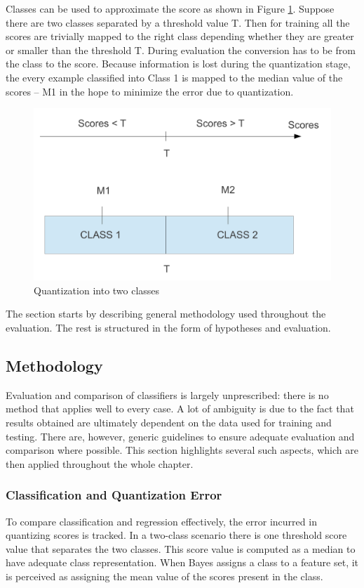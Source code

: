 \documentclass[12pt,notitlepage,twoside]{scrreprt}
\begin{document}
Classes can be used to approximate the score as shown in Figure
\ref{diag:quant}. Suppose there are two classes separated by a threshold value T. Then for
training all the scores are trivially mapped to the right class depending whether they are
greater or smaller than the threshold T. During evaluation the conversion has to be from
the class to the score. Because information is lost during the quantization stage, the
every example classified into Class 1 is mapped to the median value of the scores -- M1
in the hope to minimize the error due to quantization.
\begin{figure}[h!]
	\centering
  \includegraphics[width=0.6\linewidth]{figs/quantiz.pdf}
  \caption{Quantization into two classes\label{diag:quant}}
\end{figure}

The section starts by describing general methodology used throughout the evaluation. The
rest is structured in the form of hypotheses and evaluation. 
\subsection{Methodology}
Evaluation and comparison of classifiers is largely unprescribed: there is no method
that applies well to every case. A lot of ambiguity is due to the fact that results obtained are
ultimately dependent on the data used for training and testing. There are, however,
generic guidelines to ensure adequate evaluation and comparison where possible. 
This section highlights several such aspects, which are then applied throughout the whole
chapter.

\subsubsection*{Classification and Quantization Error}
To compare classification and regression effectively, the error incurred in quantizing
scores is tracked. In a two-class scenario there is one threshold score value that
separates the two classes. This score value is computed as a median to have adequate class
representation. When Bayes assigns a class to a feature set, it is perceived as assigning
the mean value of the scores present in the class. 
\end{document}
